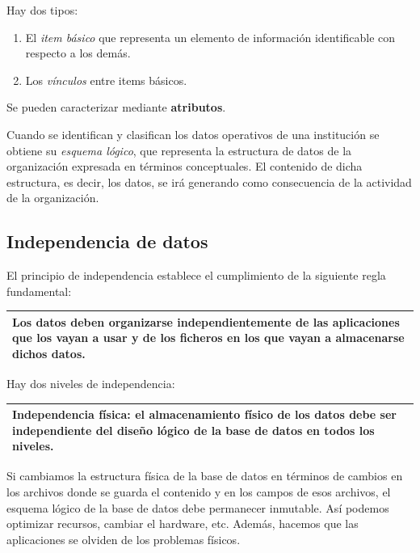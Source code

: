\documentclass[10pt,a4paper,spanish]{report}
\begin{document}
Hay dos tipos:

\begin{enumerate}[$\heartsuit$]
    \item El \textit{\textcolor[rgb]{1,0.2,0.3}{item básico}} que representa un elemento de información identificable con respecto a los demás.
    \item Los \textit{\textcolor[rgb]{1,0.2,0.3}{vínculos}} entre items básicos.
\end{enumerate}

Se pueden caracterizar mediante \textcolor[rgb]{1,0.2,0.3}{\textbf{atributos}}.

Cuando se identifican y clasifican los datos operativos de una institución se obtiene su \textcolor[rgb]{1,0.2,0.3}{\textit{esquema lógico}}, que representa la estructura de datos de la organización expresada en términos conceptuales. El contenido de dicha estructura, es decir, los datos, se irá generando como consecuencia de la actividad de la organización.

\textcolor[rgb]{1,0.2,0.3}{\section{Independencia de datos}}
El principio de independencia establece el cumplimiento de la siguiente regla fundamental:

\begin{center}
\begin{tabular}{|p{12cm}|}
\hline
Los datos deben organizarse independientemente de las aplicaciones que los vayan a usar y de los ficheros en los que vayan a almacenarse dichos datos. \\
\hline
\end{tabular}
\end{center}

Hay dos niveles de independencia:
\begin{center}
\begin{tabular}{|p{12cm}|}
\hline
\textcolor[rgb]{1,0.2,0.3}{\textbf{Independencia física}}: el almacenamiento físico de los datos debe ser independiente del diseño lógico de la base de datos en todos los niveles.\\
\hline
\end{tabular}
\end{center}

Si cambiamos la estructura física de la base de datos en términos de cambios en los archivos donde se guarda el contenido y en los campos de esos archivos, el esquema lógico de la base de datos debe permanecer inmutable. Así podemos optimizar recursos, cambiar el hardware, etc. Además, hacemos que las aplicaciones se olviden de los problemas físicos.
\end{document}
